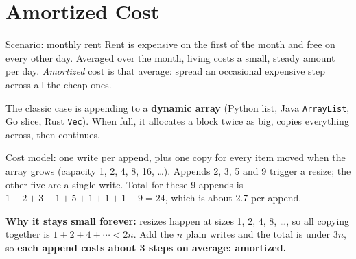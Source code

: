 \documentclass[11pt,a4paper]{article}
\newcommand{\Oone}{\On{1}}
\begin{document}
\section{Amortized Cost}\label{s:amort}

\begin{callout}[indigo]{Scenario: monthly rent}
Rent is expensive on the first of the month and free on every other day. Averaged over the month, living costs a small, steady amount per day.
\emph{Amortized} cost is that average: spread an occasional expensive step across all the cheap ones.
\end{callout}

The classic case is appending to a \textbf{dynamic array} (Python list, Java \texttt{ArrayList}, Go slice, Rust \texttt{Vec}). When full, it allocates a block twice as big, copies everything across, then continues.

\begin{center}
\end{center}

Cost model: one write per append, plus one copy for every item moved when the array grows (capacity 1, 2, 4, 8, 16, \ldots). Appends 2, 3, 5 and 9 trigger a resize; the other five are a single write. Total for these 9 appends is $1+2+3+1+5+1+1+1+9 = 24$, which is about 2.7 per append.

\textbf{Why it stays small forever:} resizes happen at sizes 1, 2, 4, 8, \ldots, so all copying together is $1 + 2 + 4 + \cdots < 2n$. Add the $n$ plain writes and the total is under $3n$, so \textbf{each append costs about 3 steps on average: \Oone{} amortized.}
\end{document}
